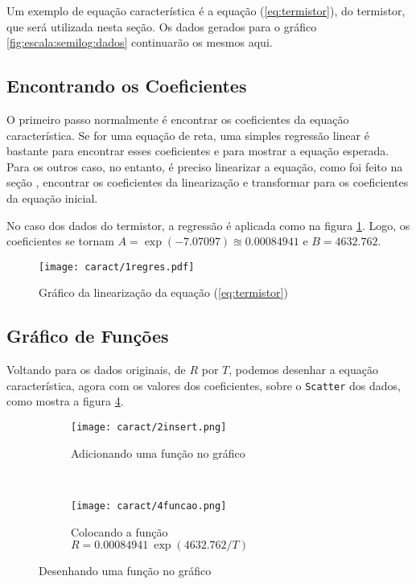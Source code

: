 Um exemplo de equação característica é a equação (\ref{eq:termistor}), do termistor, que será utilizada nesta seção. Os dados gerados para o gráfico \ref{fig:escala:semilog:dados} continuarão os mesmos aqui.

\subsection{Encontrando os Coeficientes}

    O primeiro passo normalmente é encontrar os coeficientes da equação característica. Se for uma equação de reta, uma simples regressão linear é bastante para encontrar esses coeficientes e para mostrar a equação esperada. Para os outros caso, no entanto, é preciso linearizar a equação, como foi feito na seção , encontrar os coeficientes da linearização e transformar para os coeficientes da equação inicial.

    No caso dos dados do termistor, a regressão é aplicada como na figura \ref{fig:caract:regres}. Logo, os coeficientes se tornam $A = \exp(-7.07097) \approxeq 0.00084941$ e $B = 4632.762$.

    \begin{figure}[htbp]
        \centering
        \texttt{[image: caract/1regres.pdf]}

        \caption{Gráfico da linearização da equação (\ref{eq:termistor})}
        \label{fig:caract:regres}
    \end{figure}


    \subsection{Gráfico de Funções}

    Voltando para os dados originais, de $R$ por $T$, podemos desenhar a equação característica, agora com os valores dos coeficientes, sobre o \texttt{Scatter} dos dados, como mostra a figura \ref{fig:caract:inserir}.

    \begin{figure}[htbp]
        \centering
        \begin{subfigure}{0.32\textwidth}
            \centering
            \texttt{[image: caract/2insert.png]}

            \caption{Adicionando uma função no gráfico}
            \label{fig:caract:novo}
        \end{subfigure}
        ~
        \begin{subfigure}{0.63\textwidth}
            \centering
            \texttt{[image: caract/4funcao.png]}

            \caption{Colocando a função $R = 0.00084941 ~ \exp(4632.762/T)$}
            \label{fig:caract:funcao}
        \end{subfigure}
        \caption{Desenhando uma função no gráfico}
        \label{fig:caract:inserir}
    \end{figure}


